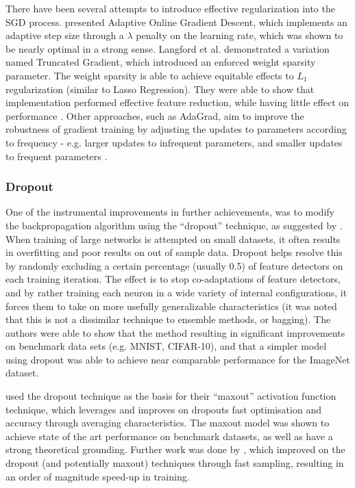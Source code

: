\documentclass[a4paper,11pt,oneside]{article}
\theoremstyle{plain}
\theoremstyle{definition}
\begin{document}
	There have been several attempts to introduce effective regularization into the SGD process. \citet{Bartlett} 
	presented Adaptive Online Gradient Descent, which implements an adaptive step size through a $\lambda$ 
	penalty on the learning rate, which was shown to be nearly optimal in a strong sense. Langford et al. 
	demonstrated a variation named Truncated Gradient, which introduced an enforced weight sparsity parameter. 
	The weight sparsity is able to achieve equitable effects to $L_1$ regularization (similar to Lasso Regression). 
	They were able to show that implementation performed effective feature reduction, while having little effect on 
	performance \citep{Langford}. Other approaches, such as AdaGrad, aim to improve the robustness of gradient training by 
	adjusting the updates to parameters according to frequency - e.g. larger updates to infrequent parameters, and 
	smaller updates to frequent parameters \citep{Duchi, Zeiler}. 
	\hfill\break
	
	\subsubsection{Dropout}
	
	One of the instrumental improvements in further achievements, was to modify the backpropagation 
	algorithm using the ``dropout'' technique, as suggested by \citet{Hinton4}. When training of large networks is 
	attempted on small datasets, it often results in overfitting and poor results on out of sample data. Dropout helps 
	resolve this by randomly excluding a certain percentage (usually 0.5) of feature detectors on each training iteration. 
	The effect is to stop co-adaptations of feature detectors, and by rather training each neuron in a wide variety of 
	internal configurations, it forces them to take on more usefully generalizable characteristics (it was noted that this
	is not a dissimilar technique to ensemble methods, or bagging). The authors were able to show that the method
	resulting in significant improvements on benchmark data sets (e.g. MNIST, CIFAR-10), and that a simpler model 
	using dropout was able to achieve near comparable performance for the ImageNet dataset.
	\hfill \break 
	
	\citet{Goodfellow} used the dropout technique as the basis for their ``maxout'' activation function technique, which 
	leverages and improves on dropout\textsc{}s fast optimisation and accuracy through averaging characteristics. The 
	maxout model was shown to achieve state of the art performance on benchmark datasets, as well as have a 
	strong theoretical grounding. Further work was done by \citet{Wang2}, which improved on the dropout 
	(and potentially maxout) techniques through fast sampling, resulting in an order of magnitude speed-up in
	training.
	\hfill \break 
	
\end{document}
